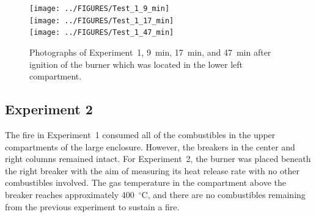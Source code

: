 \documentclass[12pt]{article}
\begin{document}
\begin{figure}[p]
\centering
\texttt{[image: ../FIGURES/Test\_1\_9\_min]} \\
\texttt{[image: ../FIGURES/Test\_1\_17\_min]} \\
\texttt{[image: ../FIGURES/Test\_1\_47\_min]}
\caption[Photographs of Experiment~1]{Photographs of Experiment~1, 9~min, 17~min, and 47~min after ignition of the burner which was located in the lower left compartment.}
\label{fig:Test_1_photos}
\end{figure}



\clearpage

\subsection{Experiment 2}

The fire in Experiment~1 consumed all of the combustibles in the upper compartments of the large enclosure. However, the breakers in the center and right columns remained intact. For Experiment~2, the burner was placed beneath the right breaker with the aim of measuring its heat release rate with no other combustibles involved. The gas temperature in the compartment above the breaker reaches approximately 400~$^\circ$C, and there are no combustibles remaining from the previous experiment to sustain a fire.
\end{document}
